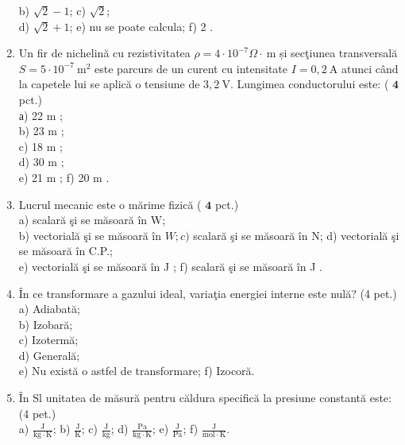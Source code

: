 \begin{enumerate}
b) $\sqrt{2}-1$; c) $\sqrt{2}$;\\
d) $\sqrt{2}+1$; e) nu se poate calcula; f) 2 .
  \item Un fir de nichelină cu rezistivitatea $\rho=4 \cdot 10^{-7} \Omega \cdot \mathrm{~m}$ și secţiunea transversală $S=5 \cdot 10^{-7} \mathrm{~m}^{2}$ este parcurs de un curent cu intensitate $I=0,2 \mathrm{~A}$ atunci când la capetele lui se aplică o tensiune de $3,2 \mathrm{~V}$. Lungimea conductorului este: ( $\mathbf{4}$ pct.)\\
а) 22 m ;\\
b) 23 m ;\\
c) 18 m ;\\
d) 30 m ;\\
e) 21 m ; f) 20 m .
  \item Lucrul mecanic este o mărime fizică ( $\mathbf{4}$ pct.)\\
a) scalară şi se măsoară în W;\\
b) vectorială şi se măsoară în $W ; c)$ scalară şi se măsoară în N; d) vectorială şi se măsoară în C.P.;\\
e) vectorială şi se măsoară în J ; f) scalară şi se măsoară în J .
  \item În ce transformare a gazului ideal, variaţia energiei interne este nulă? (4 pet.)\\
a) Adiabată;\\
b) Izobară;\\
c) Izotermă;\\
d) Generală;\\
e) Nu există o astfel de transformare; f) Izocoră.
  \item În Sl unitatea de măsură pentru căldura specifică la presiune constantă este: (4 pet.)\\
a) $\frac{\mathrm{J}}{\mathrm{kg} \cdot \mathrm{K}}$; b) $\frac{\mathrm{J}}{\mathrm{K}}$; c) $\frac{\mathrm{J}}{\mathrm{kg}}$; d) $\frac{\mathrm{Pa}}{\mathrm{kg} \cdot \mathrm{K}}$; e) $\frac{\mathrm{J}}{\mathrm{Pa}}$; f) $\frac{\mathrm{J}}{\mathrm{mol} \cdot \mathrm{K}}$.
\end{enumerate}

